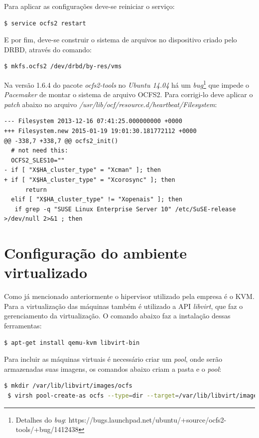 Para aplicar as configurações deve-se reiniciar o serviço:
\begin{lstlisting}[language=bash]
 $ service ocfs2 restart
\end{lstlisting}

E por fim, deve-se construir o sistema de arquivos no dispositivo criado pelo \ac{DRBD}, através do comando:
\begin{lstlisting}[language=bash]
 $ mkfs.ocfs2 /dev/drbd/by-res/vms
\end{lstlisting}

Na versão 1.6.4 do pacote \textit{ocfs2-tools} no \textit{Ubuntu 14.04} há um \textit{bug}\footnote{Detalhes do \textit{bug}: 
https://bugs.launchpad.net/ubuntu/+source/ocfs2-tools/+bug/1412438} que impede o \textit{Pacemaker} de montar o sistema de arquivo \ac{OCFS2}. 
Para corrigi-lo deve aplicar o \textit{patch} abaixo no arquivo \textit{/usr/lib/ocf/resource.d/heartbeat/Filesystem}:
\begin{lstlisting}
--- Filesystem 2013-12-16 07:41:25.000000000 +0000
+++ Filesystem.new 2015-01-19 19:01:30.181772112 +0000
@@ -338,7 +338,7 @@ ocfs2_init()
  # not need this:
  OCFS2_SLES10=""
- if [ "X$HA_cluster_type" = "Xcman" ]; then
+ if [ "X$HA_cluster_type" = "Xcorosync" ]; then
      return
  elif [ "X$HA_cluster_type" != "Xopenais" ]; then
   if grep -q "SUSE Linux Enterprise Server 10" /etc/SuSE-release >/dev/null 2>&1 ; then
\end{lstlisting}

\section{Configuração do ambiente virtualizado}

Como já mencionado anteriormente o hipervisor utilizado pela empresa é o \ac{KVM}. Para a virtualização das máquinas também é utilizado a 
\ac{API} \textit{libvirt}, que faz o gerenciamento da virtualização. O comando abaixo faz a instalação dessas ferramentas:
\begin{lstlisting}[language=bash]
 $ apt-get install qemu-kvm libvirt-bin
\end{lstlisting}

Para incluir as máquinas virtuais é necessário criar um \textit{pool}, onde serão armazenadas suas imagens, os comandos abaixo criam a pasta
e o \textit{pool}:
\begin{lstlisting}[language=bash]
 $ mkdir /var/lib/libvirt/images/ocfs
 $ virsh pool-create-as ocfs --type=dir --target=/var/lib/libvirt/images/ocfs
\end{lstlisting}


